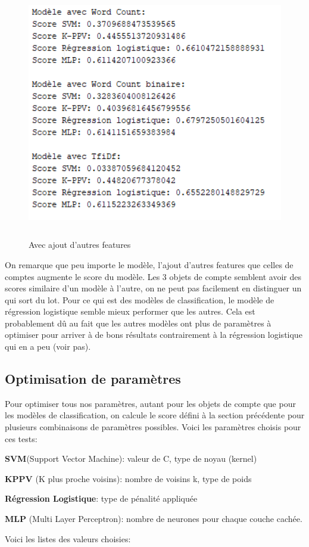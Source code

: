\documentclass[12pt,french]{article}
\begin{document}
\begin{figure}[h!]
\begin{minipage}[b]{0.45\textwidth}
		\includegraphics[width=\textwidth,height=11cm]{analyse_rapide_avec_features}
		\caption*{Avec ajout d'autres features}
	\end{minipage}
\end{figure}
\clearpage

On remarque que peu importe le modèle, l'ajout d'autres features que celles de comptes augmente le score du modèle. Les 3 objets de compte semblent avoir des scores similaire d'un modèle à l'autre, on ne peut pas facilement en distinguer un qui sort du lot. Pour ce qui est des modèles de classification, le modèle de régression logistique semble mieux performer que les autres. Cela est probablement dû au fait que les autres modèles ont plus de paramètres à optimiser pour arriver à de bons résultats contrairement à la régression logistique qui en a peu (voir pas).


\subsection*{Optimisation de paramètres}


Pour optimiser tous nos paramètres, autant pour les objets de compte que pour les modèles de classification, on calcule le score défini à la section précédente pour plusieurs combinaisons de paramètres possibles. Voici les paramètres choisis pour ces tests:

\begin{description}
\item \textbf{SVM}(Support Vector Machine): valeur de C, type de noyau (kernel)
\item \textbf{KPPV} (K plus proche voisins): nombre de voisins k, type de poids
\item \textbf{Régression Logistique}: type de pénalité appliquée
\item \textbf{MLP} (Multi Layer Perceptron): nombre de neurones pour chaque couche cachée.
\end{description}
Voici les listes des valeurs choisies:
\end{document}
